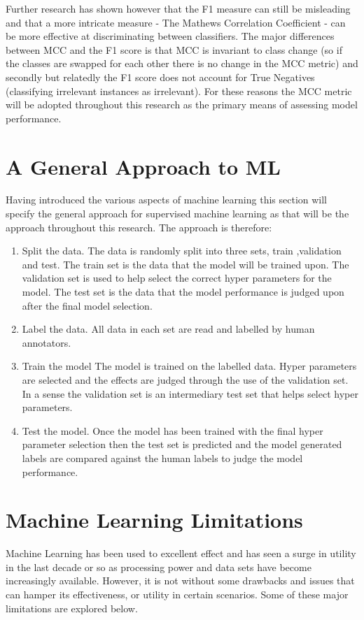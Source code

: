 Further research \parencite{chicco2020advantages} has shown however that the F1 measure can still be misleading and that a more intricate measure - The Mathews Correlation Coefficient - can be more effective at discriminating between classifiers. The major differences between MCC and the F1 score is that MCC is invariant to class change (so if the classes are swapped for each other there is no change in the MCC metric) and secondly but relatedly the F1 score does not account for True Negatives (classifying irrelevant instances as irrelevant).  For these reasons the MCC metric will be adopted throughout this research as the primary means of assessing model performance. 
 

\section{A General Approach to ML} Having introduced the various aspects of machine learning this section will specify the general approach for supervised machine learning as that will be the approach throughout this research. The approach is therefore:

\begin{enumerate}
\item{Split the data.} The data is randomly split into three sets, train ,validation and test. The train set is the data that the model will be trained upon. The validation set is used to help select the correct hyper parameters for the model. The test set is the data that the model performance is judged upon after the final model selection. 
\item{Label the data.} All data in each set are read and labelled by human annotators.
\item{Train the model} The model is trained on the labelled data. Hyper parameters are selected and the effects are judged through the use of the validation set. In a sense the validation set is an intermediary test set that helps select hyper parameters.
\item{Test the model.} Once the model has been trained with the final hyper parameter selection then the test set is predicted and the model generated labels are compared against the human labels to judge the model performance.  
\end{enumerate}

\section{Machine Learning Limitations} Machine Learning has been used to excellent effect and has seen a surge in utility in the last decade or so as processing power and data sets have become increasingly available. However, it is not without some drawbacks and issues that can hamper its effectiveness, or utility in certain scenarios. Some of these major limitations are explored below.

